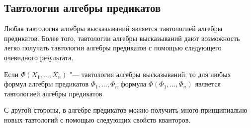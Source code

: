 \subsection*{Тавтологии алгебры предикатов}
Любая тавтология алгебры высказываний 
является тавтологией алгебры предикатов. 
Более того, тавтологии алгебры высказываний 
дают возможность легко получать тавтологии 
алгебры предикатов с помощью следующего 
очевидного результата.

\begin{lemma}[1]
    Если $\Phi(X_1,\ldots,X_n)$ "--- тавтология 
алгебры высказываний, то для любых формул 
алгебры предикатов $\Phi_1,\ldots,\Phi_n$ формула $\Phi(\Phi_1,\ldots,\Phi_n)$
является тавтологией алгебры предикатов.

С другой стороны, в алгебре предикатов можно 
получить много принципиально новых тавтологий с 
помощью следующих свойств кванторов.
\end{lemma}


